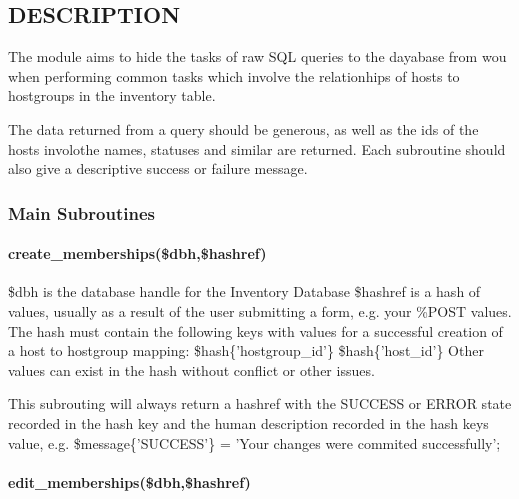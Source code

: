 \documentclass{book}
\begin{document}
\subsection{DESCRIPTION}
\label{Inventory::Memberships_DESCRIPTION}
\hypertarget{Inventory::Memberships_DESCRIPTION}{}



The module aims to hide the tasks of raw SQL queries to the dayabase from wou when performing common tasks which involve the relationhips of hosts to hostgroups in the inventory table.



The data returned from a query should be generous, as well as the ids of the hosts involothe names, statuses and similar are returned. Each subroutine should also give a descriptive success or failure message.


\subsubsection{Main Subroutines}
\label{Inventory::Memberships_Main_Subroutines}
\hypertarget{Inventory::Memberships_Main_Subroutines}{}


\paragraph*{create\protect\_memberships(\$dbh,\$hashref)}
\label{Inventory::Memberships_create_memberships_dbh_hashref_}
\hypertarget{Inventory::Memberships_create_memberships_dbh_hashref_}{}



\$dbh is the database handle for the Inventory Database \$hashref is a hash of values, usually as a result of the user submitting a form, e.g. your \%POST values. The hash must contain the following keys with values for a successful creation of a host to hostgroup mapping: \$hash\{'hostgroup\_id'\} \$hash\{'host\_id'\} Other values can exist in the hash without conflict or other issues.



This subrouting will always return a hashref with the SUCCESS or ERROR state recorded in the hash key and the human description recorded in the hash keys value, e.g. \$message\{'SUCCESS'\} = 'Your changes were commited successfully';


\paragraph*{edit\protect\_memberships(\$dbh,\$hashref)}
\label{Inventory::Memberships_edit_memberships_dbh_hashref_}
\hypertarget{Inventory::Memberships_edit_memberships_dbh_hashref_}{}
\end{document}
